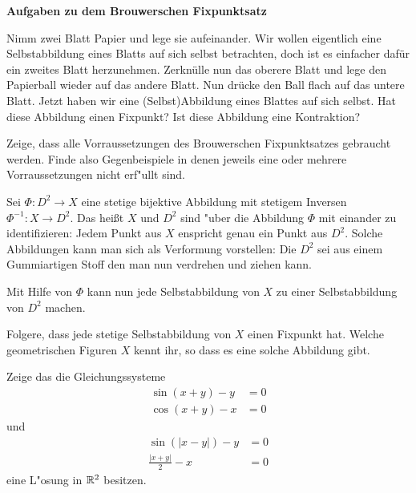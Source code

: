 \documentclass[a4paper,10pt]{article}
\begin{document}
{\Large \textbf{Aufgaben zu dem Brouwerschen Fixpunktsatz}}

\begin{Aufg}
Nimm zwei Blatt Papier und lege sie aufeinander. Wir wollen eigentlich eine Selbstabbildung
eines Blatts auf sich selbst betrachten, doch ist es einfacher dafür ein zweites Blatt herzunehmen.
Zerknülle nun das oberere Blatt und lege den Papierball wieder auf das andere Blatt. Nun drücke den 
Ball flach auf das untere Blatt. Jetzt haben wir eine (Selbst)Abbildung eines Blattes auf sich selbst.
Hat diese Abbildung einen Fixpunkt? Ist diese Abbildung eine Kontraktion?
 
\end{Aufg}




\begin{Aufg}
 
 Zeige, dass alle Vorraussetzungen des Brouwerschen Fixpunktsatzes gebraucht werden. Finde also 
 Gegenbeispiele in denen jeweils eine oder mehrere Vorraussetzungen nicht erf"ullt sind.
 
\end{Aufg}

\begin{Aufg}
 
 Sei $\Phi:D^2 \to X$ eine stetige bijektive Abbildung mit stetigem Inversen $\Phi^{-1}:X \to D^2$.
 Das heißt $X$ und $D^2$ sind "uber die Abbildung $\Phi$ mit einander zu identifizieren:
 Jedem Punkt aus $X$ enspricht genau ein Punkt aus $D^2$.
 Solche Abbildungen kann man sich als Verformung vorstellen: Die $D^2$ sei aus einem Gummiartigen Stoff
 den man nun verdrehen und ziehen kann.
 
 Mit Hilfe von $\Phi$ kann nun jede Selbstabbildung von $X$ zu einer Selbstabbildung von $D^2$ machen.
 
 Folgere, dass  jede stetige Selbstabbildung von $X$ einen Fixpunkt hat.
 Welche geometrischen Figuren $X$ kennt ihr, so dass es eine solche Abbildung gibt.
 
\end{Aufg}


\begin{Aufg}
 Zeige das die Gleichungssysteme
 \begin{align*}
  \sin(x+y) - y &=0 \\           
  \cos(x+y) - x &=0
 \end{align*}
 und
  \begin{align*}
  \sin(|x-y|) - y &=0 \\           
  \frac{|x+y|}{2} - x &=0
 \end{align*}
eine L"osung in $\mathbb{R}^2$ besitzen.
\end{Aufg}
\end{document}
